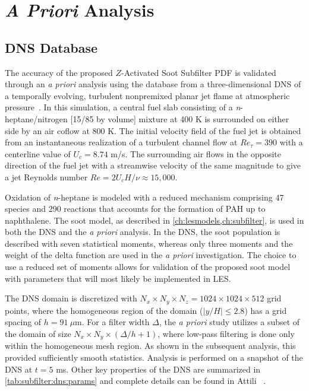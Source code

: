 \section{\textit{A Priori} Analysis}
\label{sec:subfilter:dns}

\subsection{DNS Database}
\label{sec:subfilter:dns:database}

The accuracy of the proposed $Z$-Activated Soot Subfilter PDF is validated through an \textit{a priori} analysis using the database from a three-dimensional DNS of a temporally evolving, turbulent nonpremixed planar jet flame at atmospheric pressure~\cite{attili2014}. In this simulation, a central fuel slab consisting of a \textit{n}-heptane/nitrogen [15/85 by volume] mixture at 400 K is surrounded on either side by an air coflow at 800 K. The initial velocity field of the fuel jet is obtained from an instantaneous realization of a turbulent channel flow at $Re_{\tau} = 390$ with a centerline value of $U_c = 8.74$ m/s. The surrounding air flows in the opposite direction of the fuel jet with a streamwise velocity of the same magnitude to give a jet Reynolds number $Re = 2U_c H/\nu \approx 15,000$.

Oxidation of \textit{n}-heptane is modeled with a reduced mechanism comprising 47 species and 290 reactions that accounts for the formation of PAH up to naphthalene. The soot model, as described in \cref{ch:lesmodels,ch:subfilter}, is used in both the DNS and the \textit{a priori} analysis. In the DNS, the soot population is described with seven statistical moments, whereas only three moments and the weight of the delta function are used in the \textit{a priori} investigation. The choice to use a reduced set of moments allows for validation of the proposed soot model with parameters that will most likely be implemented in LES.

The DNS domain is discretized with $N_x \times N_y \times N_z = 1024 \times 1024 \times 512$ grid points, where the homogeneous region of the domain ($|y/H| \le 2.8$) has a grid spacing of $h = 91\ \mu$m. For a filter width $\Delta$, the \textit{a priori} study utilizes a subset of the domain of size $N_x \times N_y \times (\Delta/h + 1)$, where low-pass filtering is done only within the homogeneous mesh region. As shown in the subsequent analysis, this provided sufficiently smooth statistics. Analysis is performed on a snapshot of the DNS at $t = 5$ ms. Other key properties of the DNS are summarized in \cref{tab:subfilter:dns:params} and complete details can be found in Attili \etal~\cite{attili2014}.

